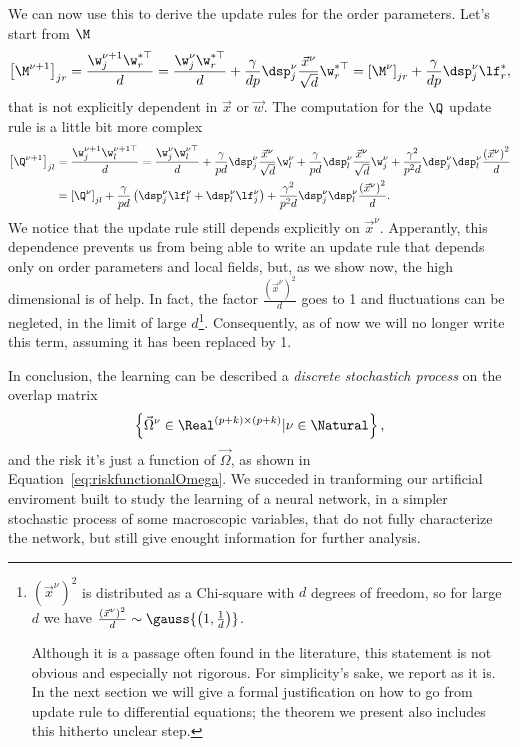 We can now use this to derive the update rules for the order parameters.
Let's start from \(\M\)
\begin{equation} \label{eq:update_rule_M}
  \left[\M^{\nu+1}\right]_{jr} = \frac{\w^{\nu+1}_j \w^{*\top}_r}{d}
    = \frac{\w^{\nu}_j \w^{*\top}_r}{d} + \frac{\gamma}{dp} \dsp^\nu_j \frac{\vec{x}^\nu}{\sqrt{d}}\w^{*\top}_r
    = \left[\M^{\nu}\right]_{jr} + \frac{\gamma}{dp} \dsp^\nu_j \lf_r^*,
\end{equation}
that is not explicitly dependent in \(\vec{x}\) or \(\vec{w}\). The computation
for the \(\Q\) update rule is a little bit more complex
\begin{equation}\label{eq:update_rule_Q}\begin{split}
  \left[\Q^{\nu+1}\right]_{jl} &= \frac{\w^{\nu+1}_j \w^{\nu+1\top}_l}{d}
    = \frac{\w^{\nu}_j \w^{\nu\top}_l}{d} + \frac{\gamma}{pd} \dsp^\nu_j \frac{\vec{x}^\nu}{\sqrt{d}}\w_l^\nu
      + \frac{\gamma}{pd} \dsp^\nu_l \frac{\vec{x}^\nu}{\sqrt{d}}\w_j^\nu 
      + \frac{\gamma^2}{p^2d} \dsp^\nu_j\dsp^\nu_l \frac{\left(\vec{x}^\nu\right)^2}{d}\\
    &= \left[\Q^{\nu}\right]_{jl} + \frac{\gamma}{pd}\left(\dsp^\nu_j \lf_l^\nu + \dsp^\nu_l \lf_j^\nu\right)
    + \frac{\gamma^2}{p^2d} \dsp^\nu_j\dsp^\nu_l \frac{\left(\vec{x}^\nu\right)^2}{d}.
\end{split}\end{equation}
We notice that the update rule still depends explicitly on \(\vec{x}^\nu\).
Apperantly, this dependence prevents us from being able to write an update rule
that depends only on order parameters and local fields, but, as we show now, the 
high dimensional is of help.
In fact, the factor \(\frac{\left(\vec{x}^\nu\right)^2}{d}\) goes to 1 and 
fluctuations can be negleted, in the limit of large \(d\)\footnote{
  \(\left(\vec{x}^\nu\right)^2\) is distributed as a Chi-square with \(d\) degrees
  of freedom, so for large \(d\) we have 
  \(\frac{\left(\vec{x}^\nu\right)^2}{d} \sim \gauss{\left(1,\frac1d\right)}\).

  Although it is a passage often found in the literature,
  this statement is not obvious and especially not rigorous.
  For simplicity's sake, we report as it is.
  In the next section we will give a formal justification on how to go from update rule
  to differential equations; the theorem we present also includes this hitherto unclear step.
}. Consequently, as of now we will no longer write this term, assuming it has been replaced by 1.

In conclusion, the learning can be described a \emph{discrete stochastich process}
on the overlap matrix
\[\left\{\vec{\Omega}^\nu \in \Real^{(p+k)\times(p+k)}|\nu\in\Natural\right\},\]
and the risk it's just a function of \(\vec{\Omega}\), as shown in Equation~\eqref{eq:riskfunctionalOmega}.
We succeded in tranforming our artificial enviroment built to study the learning of a neural network,
in a simpler stochastic process of some macroscopic variables, that do not fully characterize
the network, but still give enought information for further analysis.





